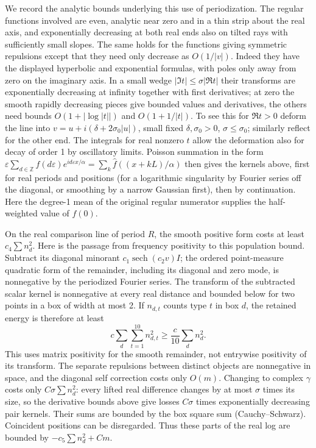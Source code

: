 We record the analytic bounds underlying this use of periodization. The regular functions involved are even, analytic near zero and in a thin strip about the real axis, and exponentially decreasing at both real ends also on tilted rays with sufficiently small slopes. The same holds for the functions giving symmetric repulsions except that they need only decrease as \(O(1/|v|)\). Indeed they have the displayed hyperbolic and exponential formulas, with poles only away from zero on the imaginary axis. In a small wedge \(|\Im t|\le\sigma |\Re t|\) their transforms are exponentially decreasing at infinity together with first derivatives; at zero the smooth rapidly decreasing pieces give bounded values and derivatives, the others need bounds \(O(1+|\log|t||)\) and \(O(1+1/|t|)\). To see this for \(\Re t>0\) deform the line into \(v=u+i(\delta+2\sigma_0|u|)\), small fixed \(\delta,\sigma_0>0\), \(\sigma\le\sigma_0\); similarly reflect for the other end. The integrals for real nonzero \(t\) allow the deformation also for decay of order 1 by oscillatory limits. Poisson summation in the form
\(\varepsilon\sum_{d\in\mathbb Z} f(d\varepsilon)e^{i d\varepsilon x/\alpha}=\sum_k \widehat f((x+kL)/\alpha)\)
then gives the kernels above, first for real periods and positions (for a logarithmic singularity by Fourier series off the diagonal, or smoothing by a narrow Gaussian first), then by continuation. Here the degree-1 mean of the original regular numerator supplies the half-weighted value of \(f(0)\).

On the real comparison line of period \(R\), the smooth positive form costs at least \(c_4\sum n_d^2\). Here is the passage from frequency positivity to this population bound. Subtract its diagonal minorant \(c_1\operatorname{sech}(c_2v)I\); the ordered point-measure quadratic form of the remainder, including its diagonal and zero mode, is nonnegative by the periodized Fourier series. The transform of the subtracted scalar kernel is nonnegative at every real distance and bounded below for two points in a box of width at most 2. If \(n_{d,t}\) counts type \(t\) in box \(d\), the retained energy is therefore at least
\[
 c\sum_d\sum_{t=1}^{10}n_{d,t}^2
 \ge \frac{c}{10}\sum_d n_d^2.
\]
This uses matrix positivity for the smooth remainder, not entrywise positivity of its transform. The separate repulsions between distinct objects are nonnegative in space, and the diagonal self correction costs only \(O(m)\). Changing to complex \(\gamma\) costs only \(C\sigma\sum n_d^2\): every lifted real difference changes by at most \(\sigma\) times its size, so the derivative bounds above give losses \(C\sigma\) times exponentially decreasing pair kernels. Their sums are bounded by the box square sum (Cauchy--Schwarz). Coincident positions can be disregarded. Thus these parts of the real log are bounded by \(-c_5\sum n_d^2+C m\).

